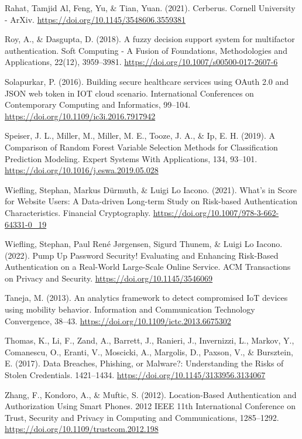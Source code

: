 \begin{thebibliography}{99}
    Rahat, Tamjid Al, Feng, Yu, \& Tian, Yuan. (2021). Cerberus. Cornell University - ArXiv. \url{https://doi.org/10.1145/3548606.3559381}
    
    Roy, A., \& Dasgupta, D. (2018). A fuzzy decision support system for multifactor authentication. Soft Computing - A Fusion of Foundations, Methodologies and Applications, 22(12), 3959–3981. \url{https://doi.org/10.1007/s00500-017-2607-6}
    
    Solapurkar, P. (2016). Building secure healthcare services using OAuth 2.0 and JSON web token in IOT cloud scenario. International Conferences on Contemporary Computing and Informatics, 99–104. \url{https://doi.org/10.1109/ic3i.2016.7917942}
    
    Speiser, J. L., Miller, M., Miller, M. E., Tooze, J. A., \& Ip, E. H. (2019). A Comparison of Random Forest Variable Selection Methods for Classification Prediction Modeling. Expert Systems With Applications, 134, 93–101. \url{https://doi.org/10.1016/j.eswa.2019.05.028}
    
    Wiefling, Stephan, Markus Dürmuth, \& Luigi Lo Iacono. (2021). What’s in Score for Website Users: A Data-driven Long-term Study on Risk-based Authentication Characteristics. Financial Cryptography. \url{https://doi.org/10.1007/978-3-662-64331-0_19}
    
    Wiefling, Stephan, Paul René Jørgensen, Sigurd Thunem, \& Luigi Lo Iacono. (2022). Pump Up Password Security! Evaluating and Enhancing Risk-Based Authentication on a Real-World Large-Scale Online Service. ACM Transactions on Privacy and Security. \url{https://doi.org/10.1145/3546069}
    
    Taneja, M. (2013). An analytics framework to detect compromised IoT devices using mobility behavior. Information and Communication Technology Convergence, 38–43. \url{https://doi.org/10.1109/ictc.2013.6675302}
    
    Thomas, K., Li, F., Zand, A., Barrett, J., Ranieri, J., Invernizzi, L., Markov, Y., Comanescu, O., Eranti, V., Moscicki, A., Margolis, D., Paxson, V., \& Bursztein, E. (2017). Data Breaches, Phishing, or Malware?: Understanding the Risks of Stolen Credentials. 1421–1434. \url{https://doi.org/10.1145/3133956.3134067}
    
    Zhang, F., Kondoro, A., \& Muftic, S. (2012). Location-Based Authentication and Authorization Using Smart Phones. 2012 IEEE 11th International Conference on Trust, Security and Privacy in Computing and Communications, 1285–1292. \url{https://doi.org/10.1109/trustcom.2012.198}
\end{thebibliography}
